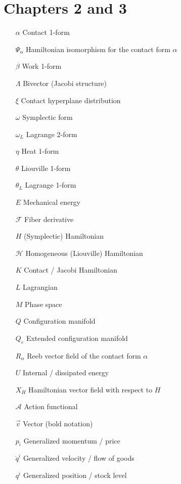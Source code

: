 \section*{Chapters 2 and 3}
\begin{itemize}[itemsep=0pt, leftmargin=2cm, labelsep=0cm, labelwidth=1.9cm, align=left]
    \item[$\alpha$] Contact 1-form
    \item[$\Psi_{\alpha}$] Hamiltonian isomorphism for the contact form $\alpha$
    \item[$\beta$] Work 1-form
    \item[$\Lambda$] Bivector (Jacobi structure)
    \item[$\xi$] Contact hyperplane distribution
    \item[$\omega$] Symplectic form
    \item[$\omega_L$] Lagrange 2-form
    \item[$\eta$] Heat 1-form
    \item[$\theta$] Liouville 1-form
    \item[$\theta_L$] Lagrange 1-form
%
    \item[$E$] Mechanical energy
    \item[$\mathscr{F}$] Fiber derivative
    \item[$H$] (Symplectic) Hamiltonian
    \item[$\mathscr{H}$] Homogeneous (Liouville) Hamiltonian
    \item[$K$] Contact / Jacobi Hamiltonian 
    \item[$L$] Lagrangian
    \item[$M$] Phase space
    \item[$Q$] Configuration manifold
    \item[$Q_e$] Extended configuration manifold
    \item[$R_\alpha$] Reeb vector field of the contact form $\alpha$ 
    \item[$U$] Internal / dissipated energy
    \item[$X_H$] Hamiltonian vector field with respect to $H$
    \item[$\mathscr{A}$] Action functional
    \item[$\vec{v}$] Vector (bold notation)
    \item[$p_i$] Generalized momentum / price
    \item[$\dot{q}^i$] Generalized velocity / flow of goods
    \item[$q^i$] Generalized position / stock level

\end{itemize}

